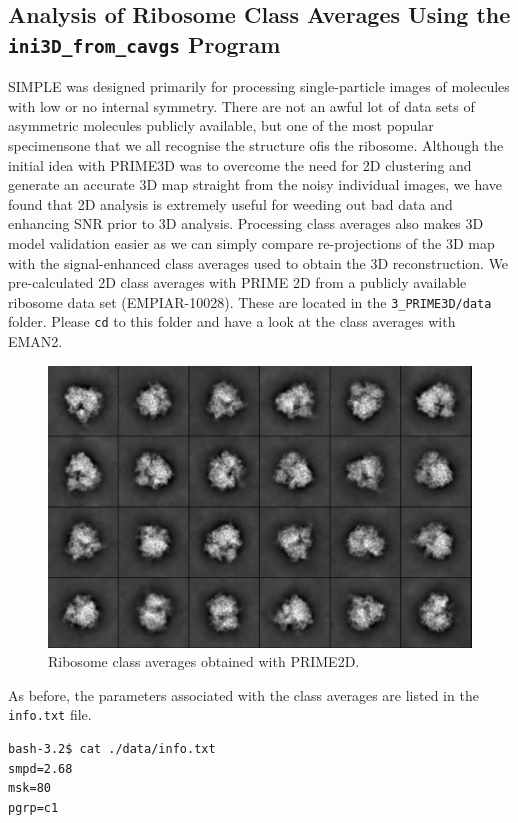\documentclass[a4paper,11pt]{article}
\newcommand{\prgname}[1]{\textcolor{NavyBlue}{\texttt{#1}}}
\begin{document}
\subsection{Analysis of Ribosome Class Averages Using the \prgname{ini3D\_from\_cavgs} Program}
SIMPLE was designed primarily for processing single-particle images of molecules with low or no internal symmetry. There are not an awful lot of data sets of asymmetric molecules publicly available, but one of the most popular specimens\textemdash{}one that we all recognise the structure of\textemdash{}is the ribosome. Although the initial idea with PRIME3D was to overcome the need for 2D clustering and generate an accurate 3D map straight from the noisy individual images, we have found that 2D analysis is extremely useful for weeding out bad data and enhancing SNR prior to 3D analysis. Processing class averages also makes 3D model validation easier as we can simply compare re-projections of the 3D map with the signal-enhanced class averages used to obtain the 3D reconstruction. We pre-calculated 2D class averages with PRIME 2D from a publicly available ribosome data set (EMPIAR-10028). These are located in the \texttt{3\_PRIME3D/data} folder. Please \texttt{cd} to this folder and have a look at the class averages with EMAN2.
\begin{figure}
\includegraphics[keepaspectratio=true,scale=0.4]{./ribocavgs}
\caption{Ribosome class averages obtained with PRIME2D.}
\end{figure}
As before, the parameters associated with the class averages are listed in the \texttt{info.txt} file.
\begin{verbatim}
bash-3.2$ cat ./data/info.txt 
smpd=2.68
msk=80
pgrp=c1
\end{verbatim}
\end{document}
